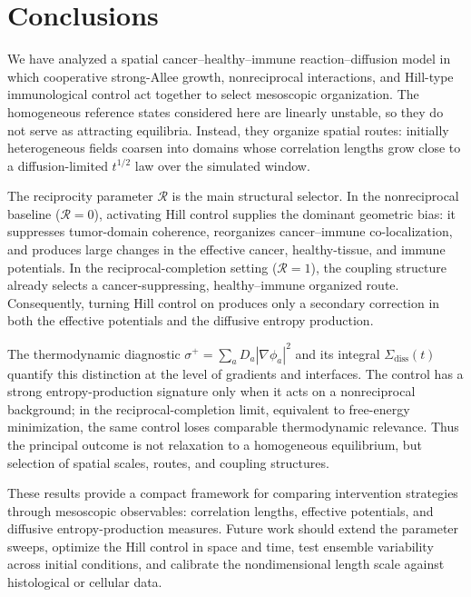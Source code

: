 \section{Conclusions}

We have analyzed a spatial cancer--healthy--immune reaction--diffusion model in which cooperative strong-Allee growth, nonreciprocal interactions, and Hill-type immunological control act together to select mesoscopic organization. The homogeneous reference states considered here are linearly unstable, so they do not serve as attracting equilibria. Instead, they organize spatial routes: initially heterogeneous fields coarsen into domains whose correlation lengths grow close to a diffusion-limited $t^{1/2}$ law over the simulated window.

The reciprocity parameter $\mathcal{R}$ is the main structural selector. In the nonreciprocal baseline ($\mathcal{R}=0$), activating Hill control supplies the dominant geometric bias: it suppresses tumor-domain coherence, reorganizes cancer--immune co-localization, and produces large changes in the effective cancer, healthy-tissue, and immune potentials. In the reciprocal-completion setting ($\mathcal{R}=1$), the coupling structure already selects a cancer-suppressing, healthy--immune organized route. Consequently, turning Hill control on produces only a secondary correction in both the effective potentials and the diffusive entropy production.

The thermodynamic diagnostic $\sigma^+=\sum_a D_a|\nabla\phi_a|^2$ and its integral $\Sigma_{\mathrm{diss}}(t)$ quantify this distinction at the level of gradients and interfaces. The control has a strong entropy-production signature only when it acts on a nonreciprocal background; in the reciprocal-completion limit, equivalent to free-energy minimization, the same control loses comparable thermodynamic relevance. Thus the principal outcome is not relaxation to a homogeneous equilibrium, but selection of spatial scales, routes, and coupling structures.

These results provide a compact framework for comparing intervention strategies through mesoscopic observables: correlation lengths, effective potentials, and diffusive entropy-production measures. Future work should extend the parameter sweeps, optimize the Hill control in space and time, test ensemble variability across initial conditions, and calibrate the nondimensional length scale against histological or cellular data.
